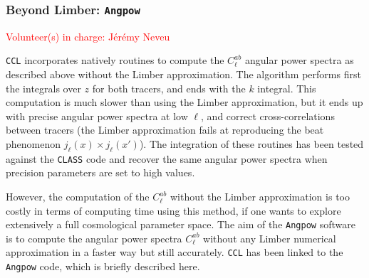 \documentclass[\docopts]{\docclass}
\newcommand{\vol}[1]{\textcolor{red}{Volunteer(s) in charge: #1}}
\newcommand{\ccl}{{\tt CCL}\xspace}
\begin{document}
\subsubsection{Beyond Limber: \texttt{Angpow}}
\vol{J\'er\'emy Neveu}

\ccl incorporates natively routines to compute the $C^{ab}_\ell$ angular power spectra as described above without the Limber approximation. The algorithm performs first the integrals over $z$ for both tracers, and ends with the $k$ integral. This computation is much slower than using the Limber approximation, but it ends up with precise angular power spectra at low $\ell$, and correct cross-correlations between tracers (the Limber approximation fails at reproducing the beat phenomenon $j_\ell(x)\times j_\ell(x')$). The integration of these routines has been tested against the \texttt{CLASS} code and recover the same angular power spectra when precision parameters are set to high values.

However, the computation of the $C^{ab}_\ell$ without the Limber approximation is too costly in terms of computing time using this method, if one wants to explore extensively a full cosmological parameter space. The aim of the \texttt{Angpow} software \citep{2017arXiv170103592C} is to compute the angular power spectra  $C_{\ell}^{ab}$  without any Limber numerical approximation in a faster way but still accurately. \ccl has been linked to the \texttt{Angpow} code,  which is briefly described here.
\end{document}
